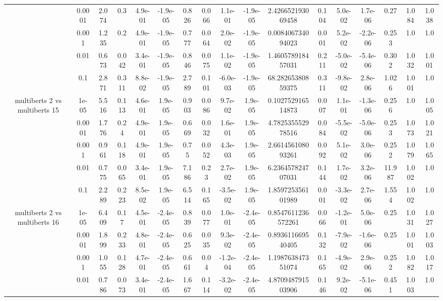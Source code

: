 \begin{tabular}{|c|c|c|c|c|c|c|c|c|c|c|c|c|c|c|c|c|}
 & 0.0001 & 2.074 & 0.3 & 4.9e-01 & -1.9e-05 & 0.826 & 0.066 & 1.1e-01 & -1.9e-05 & 2.426652193069458 & 0.104 & 5.0e-02 & 1.7e-06 & 0.27 & 1.084 & 1.038 \\
 & 0.001 & 1.235 & 0.2 & 4.9e-01 & -1.9e-05 & 0.777 & 0.064 & 2.0e-02 & -1.9e-05 & 0.008406734094023 & 0.001 & 5.2e-02 & -2.2e-06 & 0.253 & 1.0 & 1.0 \\
 & 0.01 & 0.673 & 0.042 & 3.4e-01 & -1.9e-05 & 0.846 & 0.075 & 1.1e-02 & -1.9e-05 & 1.460578918457031 & 0.211 & -5.0e-02 & -5.4e-06 & 0.302 & 1.032 & 1.001 \\
 & 0.1 & 2.871 & 0.311 & 8.8e-02 & -1.9e-05 & 2.789 & 0.101 & -6.0e-03 & -1.9e-05 & 68.28265380859375 & 0.311 & -9.8e-02 & 2.8e-06 & 1.026 & 1.001 & 1.0 \\
\hline
\multirow{5}{*}{multiberts 2 vs multiberts 15} & 1e-05 & 5.516 & 0.113 & 4.6e-01 & 1.9e-05 & 0.903 & 0.086 & 9.7e-02 & 1.9e-05 & 0.102752916514873 & 0.007 & 1.1e-01 & -1.3e-06 & 0.256 & 1.0 & 1.005 \\
 & 0.0001 & 1.776 & 0.24 & 4.9e-01 & 1.9e-05 & 0.669 & 0.032 & 1.6e-01 & 1.9e-05 & 4.782535552978516 & 0.084 & -5.5e-02 & -5.0e-06 & 0.253 & 1.073 & 1.021 \\
 & 0.001 & 0.961 & 0.118 & 4.9e-01 & 1.9e-05 & 0.75 & 0.052 & 4.3e-03 & 1.9e-05 & 2.661456108093261 & 0.092 & 5.1e-02 & 3.0e-06 & 0.252 & 1.079 & 1.065 \\
 & 0.01 & 0.775 & 0.065 & 3.4e-01 & 1.9e-05 & 7.186 & 0.23 & 2.7e-02 & 1.9e-05 & 6.236457824707031 & 0.144 & 1.7e-02 & 3.2e-06 & 11.987 & 1.002 & 1.0 \\
 & 0.1 & 2.289 & 0.223 & 8.5e-02 & 1.9e-05 & 6.514 & 0.165 & -3.5e-02 & 1.9e-05 & 1.859725356101989 & 0.001 & -3.3e-02 & 2.7e-06 & 1.554 & 1.002 & 1.0 \\
\hline
\multirow{5}{*}{multiberts 2 vs multiberts 16} & 1e-05 & 6.409 & 0.17 & 4.5e-01 & -2.4e-05 & 0.839 & 0.077 & 1.0e-01 & -2.4e-05 & 0.8547611236572261 & 0.066 & -1.2e-01 & 5.0e-06 & 0.25 & 1.031 & 1.027 \\
 & 0.0001 & 1.899 & 0.233 & 4.8e-01 & -2.4e-05 & 0.625 & 0.035 & 9.3e-02 & -2.4e-05 & 0.893611669540405 & 0.132 & -7.9e-02 & -1.6e-06 & 0.25 & 1.001 & 1.003 \\
 & 0.001 & 1.055 & 0.128 & 4.7e-01 & -2.4e-05 & 0.661 & 0.04 & -1.2e-04 & -2.4e-05 & 1.198763847351074 & 0.165 & -4.9e-02 & 2.9e-06 & 0.252 & 1.082 & 1.017 \\
 & 0.01 & 0.786 & 0.073 & 3.4e-01 & -2.4e-05 & 1.667 & 0.114 & -3.2e-02 & -2.4e-05 & 4.870948791503906 & 0.146 & 9.2e-02 & -5.1e-06 & 0.451 & 1.003 & 1.0 \\

\end{tabular}
